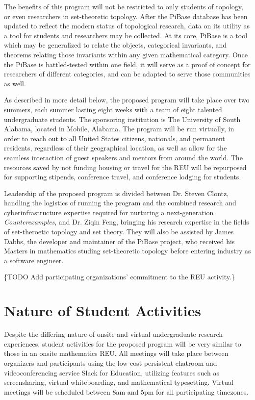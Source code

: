   The benefits of this program will not be restricted to only students of
  topology, or even researchers in set-theoretic topology. After the
  PiBase database has been updated to reflect the modern status of topological
  research, data on its utility as a tool for students and researchers may
  be collected. At its core, PiBase is a tool which may be generalized
  to relate the objects, categorical invariants, and theorems relating those
  invariants within any given mathematical category. Once the PiBase is
  battled-tested within one field, it will serve as a proof of concept for
  researchers of different categories, and can be adapted to serve those
  communities as well.

  As described in more detail below, the proposed program will take place
  over two summers, each summer lasting eight weeks
  with a team of eight talented undergraduate
  students. The sponsoring institution is The University of South
  Alabama, located in Mobile, Alabama. The program will be run virtually,
  in order to reach out to all United States citizens, nationals, and
  permanent residents, regardless of their geographical location,
  as well as allow for the seamless interaction of guest speakers and mentors
  from around the world. The resources saved by not funding housing or
  travel for the REU will be repurposed for supporting stipends,
  conference travel, and conference lodging for students.

  Leadership of the proposed program is divided between Dr. Steven Clontz,
  handling the logistics of running the program and the combined
  research and cyberinfrastructure
  expertise required for nurturing a next-generation \textit{Counterexamples},
  and Dr. Ziqin Feng, bringing his research expertise in the fields of set-theroetic
  topology and set theory. They will also be assisted by James Dabbs, the
  developer and maintainer of the PiBase project, who received his Masters
  in mathematics studing set-theoretic topology before entering industry as
  a software engineer.

  \{TODO Add participating organizations'
  commitment to the REU activity.\}

\section{Nature of Student Activities}

  Despite the differing nature of onsite and virtual undergraduate research
  experiences, student activities for the proposed program will be very similar
  to those in an onsite mathematics REU. All meetings will take place
  between organizers and participants using the low-cost persistent chatroom
  and videoconferencing service Slack for Education, utilizing features such
  as screensharing, virtual whiteboarding, and mathematical typesetting.
  Virtual meetings will be scheduled between 8am and 5pm for all
  participating timezones.

